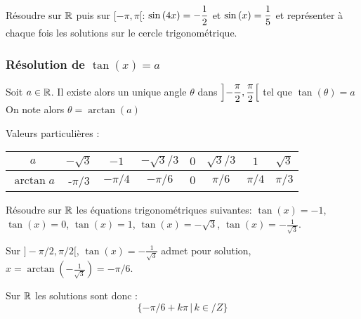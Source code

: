 \documentclass[a4paper, 11pt]{article}
\begin{document}
{\footnotesize
\begin{exo} R\'esoudre sur $\mathbb{R}$ puis sur $\lbrack -\pi,\pi\lbrack$: $\displaystyle \sin{(4x)}=-\frac{1}{2}$ et $\displaystyle \sin{(x)}=\frac{1}{5}$ et repr\'esenter \`{a} chaque fois les solutions sur le cercle trigonom\'etrique.
\end{exo}}

\vspace{0.5cm}






\subsubsection{R\'esolution de $\tan{(x)}=a$}


\begin{prop}
Soit $a \in \mathbb{R}$. Il existe alors un unique angle $\theta$ dans $\left] -\displaystyle \frac{\pi}{2}, \frac{\pi}{2} \right[$ tel que $\tan(\theta) =a $\\
On note alors $\theta = \arctan(a)$
\end{prop}



\vspace{0.5cm}
Valeurs particuli\`eres :\\

\noindent \begin{tabular}{|c|c|c|c|c|c|c|c|}
\hline
\rule[-3mm]{0pt}{8mm}  $a$& $-\sqrt{3}$&$-1$ & $-\sqrt{3}/3$ & $ 0$ & $\sqrt{3}/3$ & $1$ & $\sqrt{3}$     \\
\hline
\rule[-3mm]{0pt}{8mm}  $\arctan{a}$ &-$\pi/3$  &$-\pi/4$ &$-\pi/6$&$0$   &$\pi/6$   &$\pi/4$  &$\pi/3$ \\
\hline
\end{tabular}

\qquad



{\footnotesize
\begin{exo} R\'esoudre sur $\mathbb{R}$ les \'equations trigonom\'etriques suivantes: $\tan{(x)}=-1$, $\tan{(x)}=0$, $\tan{(x)}=1$, $\tan{(x)}=-\sqrt{3}$, $\tan{(x)}=-\frac{1}{\sqrt{3}}$. 
\end{exo}}
\begin{cor}
Sur $]-\pi/2, \pi/2[$, $\tan{(x)}=-\frac{1}{\sqrt{3}}$ admet pour solution, 
$x=\arctan(-\frac{1}{\sqrt{3}}) =-\pi/6$. 

Sur $\mathbb{R}$ les solutions sont donc : 
$$\{ -\pi/6 +k\pi \, |\, k\in /Z\}$$
\end{cor}
\end{document}
